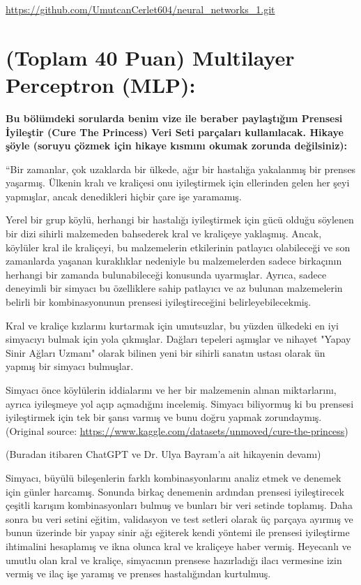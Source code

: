 \documentclass[11pt]{article}
\begin{document}
\url{https://github.com/UmutcanCerlet604/neural_networks_1.git}

\section{(Toplam 40 Puan) Multilayer Perceptron (MLP):} 
\textbf{Bu bölümdeki sorularda benim vize ile beraber paylaştığım Prensesi İyileştir (Cure The Princess) Veri Seti parçaları kullanılacak. Hikaye şöyle (soruyu çözmek için hikaye kısmını okumak zorunda değilsiniz):} 

``Bir zamanlar, çok uzaklarda bir ülkede, ağır bir hastalığa yakalanmış bir prenses yaşarmış. Ülkenin kralı ve kraliçesi onu iyileştirmek için ellerinden gelen her şeyi yapmışlar, ancak denedikleri hiçbir çare işe yaramamış.

Yerel bir grup köylü, herhangi bir hastalığı iyileştirmek için gücü olduğu söylenen bir dizi sihirli malzemeden bahsederek kral ve kraliçeye yaklaşmış. Ancak, köylüler kral ile kraliçeyi, bu malzemelerin etkilerinin patlayıcı olabileceği ve son zamanlarda yaşanan kuraklıklar nedeniyle bu malzemelerden sadece birkaçının herhangi bir zamanda bulunabileceği konusunda uyarmışlar. Ayrıca, sadece deneyimli bir simyacı bu özelliklere sahip patlayıcı ve az bulunan malzemelerin belirli bir kombinasyonunun prensesi iyileştireceğini belirleyebilecekmiş.

Kral ve kraliçe kızlarını kurtarmak için umutsuzlar, bu yüzden ülkedeki en iyi simyacıyı bulmak için yola çıkmışlar. Dağları tepeleri aşmışlar ve nihayet "Yapay Sinir Ağları Uzmanı" olarak bilinen yeni bir sihirli sanatın ustası olarak ün yapmış bir simyacı bulmuşlar.

Simyacı önce köylülerin iddialarını ve her bir malzemenin alınan miktarlarını, ayrıca iyileşmeye yol açıp açmadığını incelemiş. Simyacı biliyormuş ki bu prensesi iyileştirmek için tek bir şansı varmış ve bunu doğru yapmak zorundaymış. (Original source: \url{https://www.kaggle.com/datasets/unmoved/cure-the-princess})

(Buradan itibaren ChatGPT ve Dr. Ulya Bayram'a ait hikayenin devamı)

Simyacı, büyülü bileşenlerin farklı kombinasyonlarını analiz etmek ve denemek için günler harcamış. Sonunda birkaç denemenin ardından prensesi iyileştirecek çeşitli karışım kombinasyonları bulmuş ve bunları bir veri setinde toplamış. Daha sonra bu veri setini eğitim, validasyon ve test setleri olarak üç parçaya ayırmış ve bunun üzerinde bir yapay sinir ağı eğiterek kendi yöntemi ile prensesi iyileştirme ihtimalini hesaplamış ve ikna olunca kral ve kraliçeye haber vermiş. Heyecanlı ve umutlu olan kral ve kraliçe, simyacının prensese hazırladığı ilacı vermesine izin vermiş ve ilaç işe yaramış ve prenses hastalığından kurtulmuş.
\end{document}
